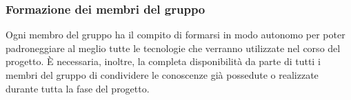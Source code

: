\subsubsection{Formazione dei membri del gruppo}
Ogni membro del gruppo ha il compito di formarsi in modo autonomo per poter padroneggiare al meglio tutte le tecnologie che verranno utilizzate nel corso del progetto.
È necessaria, inoltre, la completa disponibilità da parte di tutti i membri del gruppo di condividere le conoscenze già possedute o realizzate durante tutta la fase del progetto.